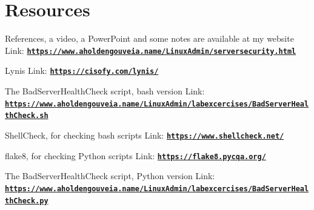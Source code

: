 \documentclass[12pt]{article}
\begin{document}
\section*{Resources}
References, a video, a PowerPoint and some notes are available at my website
Link: \href{https://www.aholdengouveia.name/LinuxAdmin/serversecurity.html}{\textbf{\nolinkurl{https://www.aholdengouveia.name/LinuxAdmin/serversecurity.html}}}

Lynis
Link: \href{https://cisofy.com/lynis/}{\textbf{\nolinkurl{https://cisofy.com/lynis/}}}

The BadServerHealthCheck script, bash version
Link: \href{https://www.aholdengouveia.name/LinuxAdmin/labexcercises/BadServerHealthCheck.sh}{\textbf{\nolinkurl{https://www.aholdengouveia.name/LinuxAdmin/labexcercises/BadServerHealthCheck.sh}}}

ShellCheck, for checking bash scripts
Link: \href{https://www.shellcheck.net/}{\textbf{\nolinkurl{https://www.shellcheck.net/}}}

flake8, for checking Python scripts
Link: \href{https://flake8.pycqa.org/}{\textbf{\nolinkurl{https://flake8.pycqa.org/}}}

The BadServerHealthCheck script, Python version
Link: \href{https://www.aholdengouveia.name/LinuxAdmin/labexcercises/BadServerHealthCheck.py}{\textbf{\nolinkurl{https://www.aholdengouveia.name/LinuxAdmin/labexcercises/BadServerHealthCheck.py}}}
\end{document}
